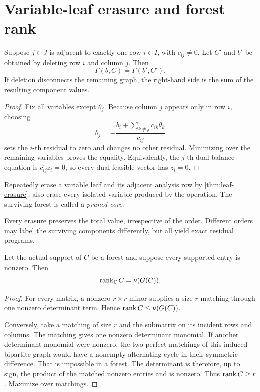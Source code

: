 \section{Variable-leaf erasure and forest rank}
\label{sec:leaf-rank}

\begin{theorem}\label{thm:leaf-erasure}
Suppose \(j\in J\) is adjacent to exactly one row \(i\in I\), with
\(c_{ij}\ne0\).  Let \(C'\) and \(b'\) be obtained by deleting row
\(i\) and column \(j\).  Then
\[
 \Gamma(b,C)=\Gamma(b',C').
\]
If deletion disconnects the remaining graph, the right-hand side is
the sum of the resulting component values.
\end{theorem}

\begin{proof}
Fix all variables except \(\theta_j\).  Because column \(j\) appears
only in row \(i\), choosing
\[
 \theta_j
 =
 -\frac{b_i+\sum_{k\ne j}c_{ik}\theta_k}{c_{ij}}
\]
sets the \(i\)-th residual to zero and changes no other residual.
Minimizing over the remaining variables proves the equality.
Equivalently, the \(j\)-th dual balance equation is
\(\overline{c_{ij}}z_i=0\), so every dual feasible vector has
\(z_i=0\).
\end{proof}

\begin{definition}\label{def:pruning}
Repeatedly erase a variable leaf and its adjacent analysis row by
\cref{thm:leaf-erasure}; also erase every isolated variable produced by
the operation.  The surviving forest is called a \emph{pruned core}.
\end{definition}

Every erasure preserves the total value, irrespective of the order.
Different orders may label the surviving components differently, but
all yield exact residual programs.

\begin{theorem}\label{thm:forest-rank}
Let the actual support of \(C\) be a forest and suppose every supported
entry is nonzero.  Then
\begin{equation}\label{eq:forest-rank}
 \operatorname{rank}_{\mathbb C}C=\nu(G(C)).
\end{equation}
\end{theorem}

\begin{proof}
For every matrix, a nonzero \(r\times r\) minor supplies a size-\(r\)
matching through one nonzero determinant term.  Hence
\(\operatorname{rank} C\le\nu(G(C))\).

Conversely, take a matching of size \(r\) and the submatrix on its
incident rows and columns.  The matching gives one nonzero determinant
monomial.  If another determinant monomial were nonzero, the two
perfect matchings of this induced bipartite graph would have a
nonempty alternating cycle in their symmetric difference.  That is
impossible in a forest.  The determinant is therefore, up to sign, the
product of the matched nonzero entries and is nonzero.  Thus
\(\operatorname{rank} C\ge r\).  Maximize over matchings.
\end{proof}

